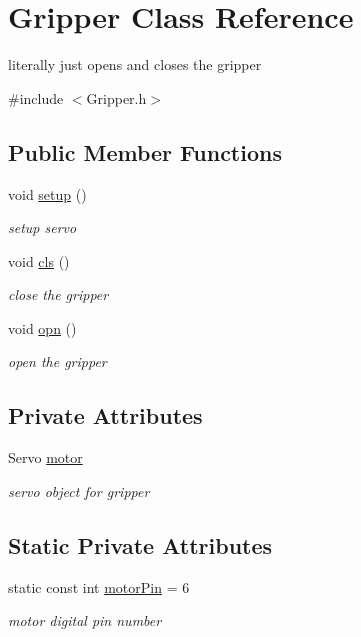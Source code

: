 \hypertarget{classGripper}{\section{Gripper Class Reference}
\label{classGripper}
}


literally just opens and closes the gripper  




{\ttfamily \#include $<$Gripper.\-h$>$}

\subsection*{Public Member Functions}
\begin{DoxyCompactItemize}
\item 
void \hyperlink{classGripper_a7eff7781d1109b4e988fa66c8141a6d7}{setup} ()
\begin{DoxyCompactList}\small\item\em setup servo \end{DoxyCompactList}\item 
void \hyperlink{classGripper_ada511826dbf5abcdd12532ae725efeaf}{cls} ()
\begin{DoxyCompactList}\small\item\em close the gripper \end{DoxyCompactList}\item 
void \hyperlink{classGripper_ab4fa689ad3f08e97c7fcd10247965ff5}{opn} ()
\begin{DoxyCompactList}\small\item\em open the gripper \end{DoxyCompactList}\end{DoxyCompactItemize}
\subsection*{Private Attributes}
\begin{DoxyCompactItemize}
\item 
Servo \hyperlink{classGripper_ad72d0ae4ccd2be00ec3f303e7a0c1cc9}{motor}
\begin{DoxyCompactList}\small\item\em servo object for gripper \end{DoxyCompactList}\end{DoxyCompactItemize}
\subsection*{Static Private Attributes}
\begin{DoxyCompactItemize}
\item 
static const int \hyperlink{classGripper_ae12467d04d155401f1c6ba694b295f40}{motor\-Pin} = 6
\begin{DoxyCompactList}\small\item\em motor digital pin number \end{DoxyCompactList}\end{DoxyCompactItemize}


